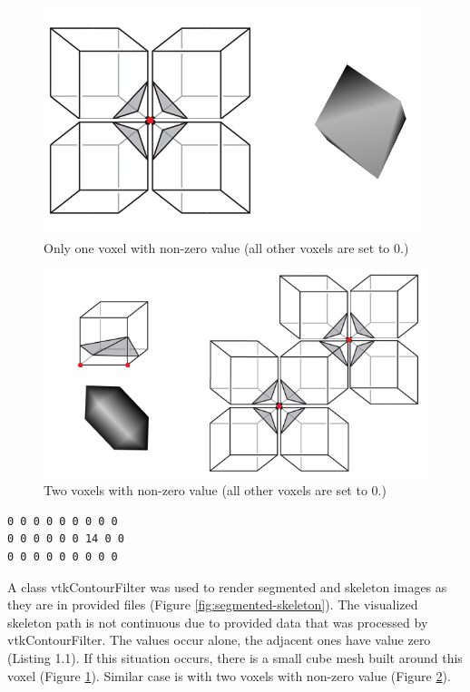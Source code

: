\begin{figure}
	\centering
	\includegraphics[scale=0.6]{fig/marching-cubes-1-point}
	\caption{Only one voxel with non-zero value (all other voxels are set to 0.)}\label{fig:marching-cubes-1-point}
\end{figure}

\begin{figure}
	\centering
	\includegraphics[scale=0.6]{fig/marching-cubes-2-points}
	\caption{Two voxels with non-zero value (all other voxels are set to 0.)}\label{fig:marching-cubes-2-points}
\end{figure}

\begin{lstlisting}[caption={A sample from skeleton file},label={lst:sample-skeleton}]
0 0 0 0 0 0 0 0 0 
0 0 0 0 0 0 14 0 0 
0 0 0 0 0 0 0 0 0 
\end{lstlisting}

A class vtkContourFilter was used to render segmented and skeleton images as they are in provided files (Figure \ref{fig:segmented-skeleton}).
The visualized skeleton path is not continuous due to provided data that was processed by vtkContourFilter. The values occur alone, the adjacent ones have value zero (Listing 1.1). If this situation occurs, there is a small cube mesh built around this voxel (Figure \ref{fig:marching-cubes-1-point}). Similar case is with two voxels with non-zero value (Figure \ref{fig:marching-cubes-2-points}).


